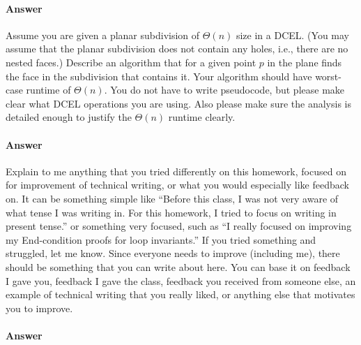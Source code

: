 \documentclass{article}
\begin{document}
\paragraph{Answer}


\collab{\todo{}}

Assume you are given a planar subdivision of $\Theta(n)$ size in a DCEL. (You may
assume that the planar subdivision does not contain any holes, i.e., there are
no nested faces.) Describe an algorithm that for a given point $p$ in the plane
finds the face in the subdivision that contains it. Your algorithm should have
worst-case runtime of
$\Theta(n)$. You do not have to write pseudocode, but please make clear what
DCEL operations you are using. Also please make sure the analysis is detailed
enough to justify the $\Theta(n)$ runtime clearly.

\paragraph{Answer}


\collab{\todo{}}

Explain to me anything that you tried differently on this homework, focused on
for improvement of technical writing, or what you would especially like feedback
on.  It can be something simple like ``Before this class, I was not very aware
of what tense I was writing in.  For this homework, I tried to focus on writing
in present tense.'' or something very focused, such as ``I really focused on
improving my End-condition proofs for loop invariants.''  If you tried something
and struggled, let me know. Since everyone needs to improve (including me),
there should be something that you can write about here.  You can base it on
feedback I gave you, feedback I gave the class, feedback you received from
someone else, an example of technical writing that you really liked, or anything
else that motivates you to improve.

\paragraph{Answer}

\end{document}
